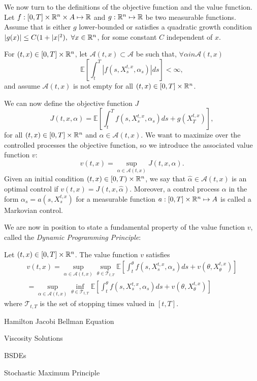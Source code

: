 We now turn to the definitions of the objective function and the value function.
Let $ f: [0,T] \times \mathbb{R}^n \times A \mapsto \mathbb{R} $ and $ g: \mathbb{R}^n \mapsto \mathbb{R} $
be two measurable functions. Assume that is either $g$ lower-bounded or 
satisfies a quadratic growth condition 
$| g(x) | \leq C(1 + |x|^2),\ \forall x \in \mathbb{R}^n$, for some constant $C$
independent of $x$.

For $(t,x) \in [0,T] \times \mathbb{R}^n$, let $\mathcal{A}(t,x) \subset \mathcal{A}$
be such that, $\forall \alpha in \mathcal{A}(t,x)$
\begin{equation}
    \mathbb{E}\left[ \int_t^T | f(s, X_s^{t,x}, \alpha_s) | ds \right] < \infty,
\end{equation}
and assume $\mathcal{A}(t,x)$ is not empty for all
$(t,x) \in [0,T] \times \mathbb{R}^n$.

We can now define the objective function $J$
\begin{equation}
    J(t, x, \alpha) = \mathbb{E}\left[ \int_t^T f(s, X_s^{t,x}, \alpha_s) ds + g(X^{t,x}_T) \right],
\end{equation}
for all $(t,x) \in [0,T] \times \mathbb{R}^n$ and $\alpha \in \mathcal{A}(t,x)$.
We want to maximize over the controlled processes the objective function, so
we introduce the associated value function $v$:
\begin{equation}
    v(t,x) = \sup_{\alpha \in \mathcal{A}(t,x)} J(t,x,\alpha).
\end{equation}
Given an initial condition $(t,x) \in \left[ 0,T \right) \times \mathbb{R}^n$, we say
that $\hat \alpha \in \mathcal{A}(t,x)$ is an optimal control if
$v(t,x) = J(t,x,\hat \alpha)$.
Moreover, a control process $\alpha$ in the form $\alpha_s = a(s,X_s^{t,x})$ for
a measurable function $a: [0,T] \times \mathbb{R}^n \mapsto A$ is
called a Markovian control.

We are now in position to state a fundamental property of the value function $v$,
called the \textit{Dynamic Programming Principle}:

\begin{theorem}
    Let $(t,x) \in [0,T] \times \mathbb{R}^n$. The value function $v$ satisfies
\begin{gather} 
        v(t,x) = \sup_{\alpha \in \mathcal{A}(t,x)}
        \sup_{\theta \in \mathcal{T}_{t,T}}
        \mathbb{E}\left[ \int_t^\theta f(s, X_s^{t,x}, \alpha_s) ds + v(\theta, X^{t,x}_\theta) \right]\\
        =\sup_{\alpha \in \mathcal{A}(t,x)}
        \inf_{\theta \in \mathcal{T}_{t,T}}
        \mathbb{E}\left[ \int_t^\theta f(s, X_s^{t,x}, \alpha_s) ds + v(\theta, X^{t,x}_\theta) \right]
\end{gather}
    where $\mathcal{T}_{t, T}$ is the set of stopping times valued in $[t,T]$.
\end{theorem}





Hamilton Jacobi Bellman Equation

Viscosity Solutions

BSDEs

Stochastic Maximum Principle